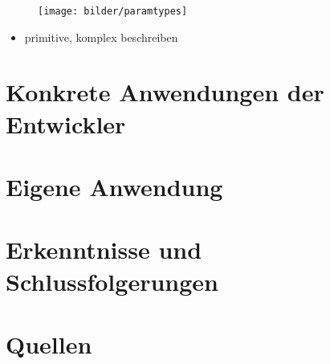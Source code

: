   \begin{frame}
      \begin{figure}[ht]
      \centering	      
      \texttt{[image: bilder/paramtypes]}
      \label{paramtypes}
    \end{figure}
  \begin{itemize}
    \item primitive, komplex beschreiben
  \end{itemize}
  \end{frame}
    

    
    \section{Konkrete Anwendungen der Entwickler}
    
    \section{Eigene Anwendung}
    
    \section{Erkenntnisse und Schlussfolgerungen}
    
    \section{Quellen}
    
    
    
    


